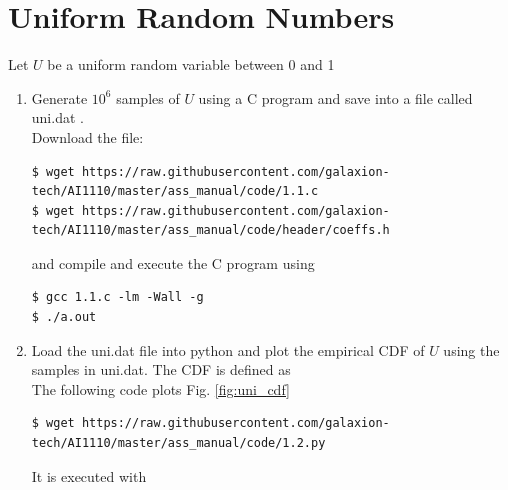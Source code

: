 \documentclass[journal,12pt,twocolumn]{IEEEtran}
\renewcommand\thesection{\arabic{section}}
\begin{document}
\maketitle
\newpage

\tableofcontents
\bigskip
\renewcommand{\thefigure}{\theenumi}
\renewcommand{\thetable}{\theenumi}
\renewcommand{\theequation}{\theenumi}


\section{Uniform Random Numbers}



Let $U$ be a uniform  random variable between 0 and 1
\begin{enumerate}[label=\thesection.\arabic*.,ref=\thesection.\theenumi]
\item Generate $10^6$ samples of $U$ using a C program and save into a file called uni.dat .\\

\solution Download the file:

\begin{lstlisting}
$ wget https://raw.githubusercontent.com/galaxion-tech/AI1110/master/ass_manual/code/1.1.c
$ wget https://raw.githubusercontent.com/galaxion-tech/AI1110/master/ass_manual/code/header/coeffs.h
\end{lstlisting}

and compile and execute the C program using

\begin{lstlisting}
$ gcc 1.1.c -lm -Wall -g
$ ./a.out
\end{lstlisting}





\item Load the uni.dat file into python and plot the empirical CDF of $U$ using the samples in uni.dat. The CDF is defined as\\

\solution  The following code plots Fig. \ref{fig:uni_cdf}

\begin{lstlisting}
$ wget https://raw.githubusercontent.com/galaxion-tech/AI1110/master/ass_manual/code/1.2.py
\end{lstlisting}

It is executed with


\end{enumerate}
\end{document}
